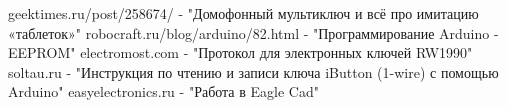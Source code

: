 \newpage


\begin{thebibliography}{}
	  geektimes.ru/post/258674/  -  "Домофонный мультиключ и всё про имитацию «таблеток»"
	  robocraft.ru/blog/arduino/82.html  -  "Программирование Arduino - EEPROM"
	  electromost.com  -  "Протокол для электронных ключей RW1990"
	  soltau.ru  -  "Инструкция по чтению и записи ключа iButton (1-wire) с помощью Arduino"
	  easyelectronics.ru -  "Работа в Eagle Cad"
\end{thebibliography}


